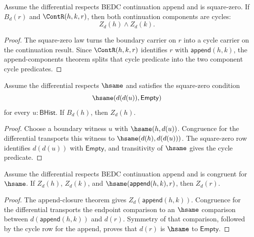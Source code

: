 \begin{theorem}
\label{thm:homology-boundary-cont-cycle-components}
Assume the differential respects BEDC continuation append and is square-zero.
If $B_d(r)$ and $\ContR(h,k,r)$, then both continuation components are cycles:
$$
Z_d(h)\wedge Z_d(k).
$$
\end{theorem}
\begin{proof}
The square-zero law turns the boundary carrier on $r$ into a cycle carrier on
the continuation result. Since $\ContR(h,k,r)$ identifies $r$ with
$\mathsf{append}(h,k)$, the append-components theorem splits that cycle
predicate into the two component cycle predicates.
\end{proof}

\begin{theorem}
\label{thm:homology-boundary-carrier-cycle-of-d-squared-zero}
Assume the differential respects $\hsame$ and satisfies the square-zero
condition
$$
\hsame(d(d(u)),\mathsf{Empty})
$$
for every $u:\mathsf{BHist}$. If $B_d(h)$, then $Z_d(h)$.
\end{theorem}
\begin{proof}
Choose a boundary witness $u$ with $\hsame(h,d(u))$. Congruence for the
differential transports this witness to
$\hsame(d(h),d(d(u)))$. The square-zero row identifies $d(d(u))$ with
$\mathsf{Empty}$, and transitivity of $\hsame$ gives the cycle predicate.
\end{proof}

\begin{theorem}
\label{thm:homology-cycle-carrier-append-hsame-transport}
Assume the differential respects BEDC continuation append and is congruent
for $\hsame$. If $Z_d(h)$, $Z_d(k)$, and
$\hsame(\mathsf{append}(h,k),r)$, then $Z_d(r)$.
\end{theorem}
\begin{proof}
The append-closure theorem gives
$Z_d(\mathsf{append}(h,k))$. Congruence for the differential transports the
endpoint comparison to an $\hsame$ comparison between
$d(\mathsf{append}(h,k))$ and $d(r)$. Symmetry of that comparison, followed
by the cycle row for the append, proves that $d(r)$ is $\hsame$ to
$\mathsf{Empty}$.
\end{proof}

